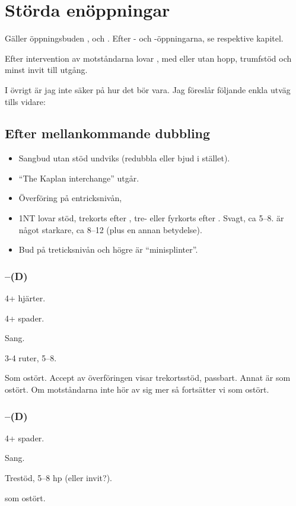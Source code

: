 \chapter{Störda en{\"o}ppningar}

Gäller öppningsbuden ,  och . Efter - och
-öppningarna, se respektive kapitel.
 
Efter intervention av motståndarna lovar , med eller utan hopp,
trumf\-stöd och minst invit till utgång.

I övrigt är jag inte säker på hur det bör vara. Jag föreslår följande enkla
utväg tills vidare:

\section{Efter mellankommande dubbling}

\begin{itemize}
\item Sangbud utan stöd undviks (redubbla eller bjud  i stället). 
\item ``The
Kaplan interchange'' utgår. 
\item Överföring på entricksnivån, 
\item 1NT lovar stöd, trekorts efter , tre- eller fyrkorts efter
  . Svagt, ca 5--8.  är något starkare, ca 8--12 (plus en
  annan betydelse).  
\item Bud på treticksnivån och högre är ``minisplinter''. 
\end{itemize}

\subsection{--(D)}
\bbe
\item[RD] 4+ hjärter.
\item[\hj{1}] 4+ spader.
\item[\spa{1}] Sang.
\item[\NT{1}] 3-4 ruter, 5--8.
\item[Resten] Som ostört.
\ebe
Accept av överföringen visar trekortsstöd, passbart. Annat är som ostört.
Om motståndarna inte hör av sig mer så fortsätter vi som ostört.
\subsection{--(D)}
\bbe
\item[RD] 4+ spader.
\item[\spa{1}] Sang.
\item[\NT{1}] Trestöd, 5--8 hp (eller invit?).
\item[Resten] som ostört.
\ebe

